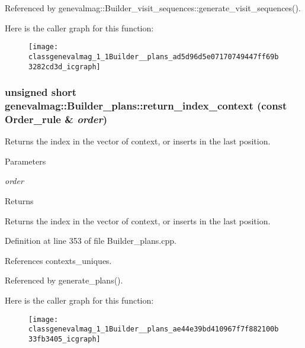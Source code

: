 Referenced by genevalmag::Builder\_\-visit\_\-sequences::generate\_\-visit\_\-sequences().



Here is the caller graph for this function:\nopagebreak
\begin{figure}[H]
\begin{center}
\leavevmode
\texttt{[image: classgenevalmag\_1\_1Builder\_\_plans\_ad5d96d5e07170749447ff69b3282cd3d\_icgraph]}
\end{center}
\end{figure}


\hypertarget{classgenevalmag_1_1Builder__plans_ae44e39bd410967f7f882100b33fb3405}{
\subsubsection[{return\_\-index\_\-context}]{\setlength{\rightskip}{0pt plus 5cm}unsigned short genevalmag::Builder\_\-plans::return\_\-index\_\-context (const {\bf Order\_\-rule} \& {\em order})}}
\label{classgenevalmag_1_1Builder__plans_ae44e39bd410967f7f882100b33fb3405}
Returns the index in the vector of context, or inserts in the last position. 
\begin{DoxyParams}{Parameters}
\item[{\em order}]\end{DoxyParams}
\begin{DoxyReturn}{Returns}

\end{DoxyReturn}
Returns the index in the vector of context, or inserts in the last position. 

Definition at line 353 of file Builder\_\-plans.cpp.



References contexts\_\-uniques.



Referenced by generate\_\-plans().



Here is the caller graph for this function:\nopagebreak
\begin{figure}[H]
\begin{center}
\leavevmode
\texttt{[image: classgenevalmag\_1\_1Builder\_\_plans\_ae44e39bd410967f7f882100b33fb3405\_icgraph]}
\end{center}
\end{figure}


